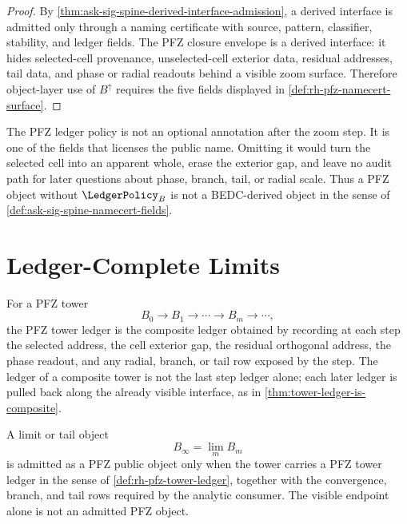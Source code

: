 \begin{proof}
By \autoref{thm:ask-sig-spine-derived-interface-admission}, a derived
interface is admitted only through a naming certificate with source,
pattern, classifier, stability, and ledger fields.  The PFZ closure
envelope is a derived interface: it hides selected-cell provenance,
unselected-cell exterior data, residual addresses, tail data, and phase
or radial readouts behind a visible zoom surface.  Therefore object-layer
use of $B^{\uparrow}$ requires the five fields displayed in
\autoref{def:rh-pfz-namecert-surface}.
\end{proof}

\begin{principle}
\label{prin:rh-pfz-ledger-policy-part-of-object}
The PFZ ledger policy is not an optional annotation after the zoom step.
It is one of the fields that licenses the public name.  Omitting it would
turn the selected cell into an apparent whole, erase the exterior gap,
and leave no audit path for later questions about phase, branch, tail, or
radial scale.  Thus a PFZ object without $\LedgerPolicy_B$ is not a
BEDC-derived object in the sense of
\autoref{def:ask-sig-spine-namecert-fields}.
\end{principle}

\section{Ledger-Complete Limits}
\label{sec:rh-pfz-ledger-complete-limits}

\begin{definition}
\label{def:rh-pfz-tower-ledger}
For a PFZ tower
$$
B_0\to B_1\to\cdots\to B_m\to\cdots,
$$
the PFZ tower ledger is the composite ledger obtained by recording at
each step the selected address, the cell exterior gap, the residual
orthogonal address, the phase readout, and any radial, branch, or tail
row exposed by the step.  The ledger of a composite tower is not the last
step ledger alone; each later ledger is pulled back along the already
visible interface, as in
\autoref{thm:tower-ledger-is-composite}.
\end{definition}

\begin{definition}
\label{def:rh-pfz-limit-admission}
A limit or tail object
$$
B_{\infty}
=
\lim_m B_m
$$
is admitted as a PFZ public object only when the tower carries a PFZ
tower ledger in the sense of \autoref{def:rh-pfz-tower-ledger}, together
with the convergence, branch, and tail rows required by the analytic
consumer.  The visible endpoint alone is not an admitted PFZ object.
\end{definition}

